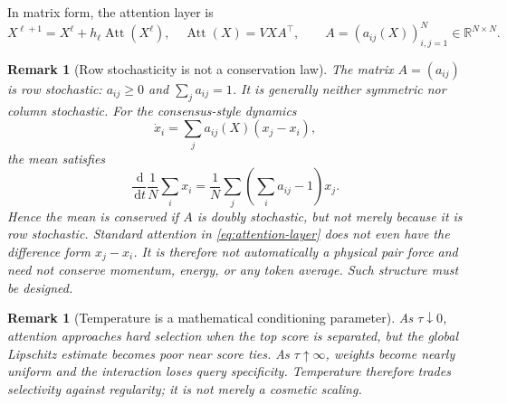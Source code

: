 \documentclass[11pt]{amsart}
\numberwithin{equation}{section}
\theoremstyle{plain}
\newtheorem{remark}[theorem]{Remark}
\newcommand{\R}{\mathbb{R}}
\newcommand{\dd}{\,\mathrm{d}}
\begin{document}
In matrix form, the attention layer is 
\begin{equation}\label{eq:attention-matrix}
 X^{\ell+1}=X^\ell+h_\ell\operatorname{Att}(X^\ell), \quad  \operatorname{Att}(X)=VXA^\top,\qquad
  A=(a_{ij}(X))_{i,j=1}^N\in \R^{N\times N}.
\end{equation}

\begin{remark}[Row stochasticity is not a conservation law]
The matrix $A=(a_{ij})$ is row stochastic:
$a_{ij}\geq0$ and $\sum_j a_{ij}=1$.  It is generally neither symmetric nor
column stochastic.  For the consensus-style dynamics
\begin{equation}\label{eq:attn-consensus-form}
  \dot x_i=\sum_j a_{ij}(X)(x_j-x_i),
\end{equation}
the mean satisfies
\[
  \frac{\dd}{\dd t}\frac1N\sum_ix_i
  =\frac1N\sum_j\left(\sum_i a_{ij}-1\right)x_j.
\]
Hence the mean is conserved if $A$ is doubly stochastic, but not merely because
it is row stochastic.  Standard attention in
\eqref{eq:attention-layer} does not even have the difference form
$x_j-x_i$.  It is therefore not automatically a physical pair force and need
not conserve momentum, energy, or any token average.  Such structure must be
designed.
\end{remark}

\begin{remark}[Temperature is a mathematical conditioning parameter]
As $\tau\downarrow0$, attention approaches hard selection when the top score is
separated, but the global Lipschitz estimate becomes poor near score ties.  As
$\tau\uparrow\infty$, weights become nearly uniform and the interaction loses
query specificity.  Temperature therefore trades selectivity against
regularity; it is not merely a cosmetic scaling.
\end{remark}
\end{document}
